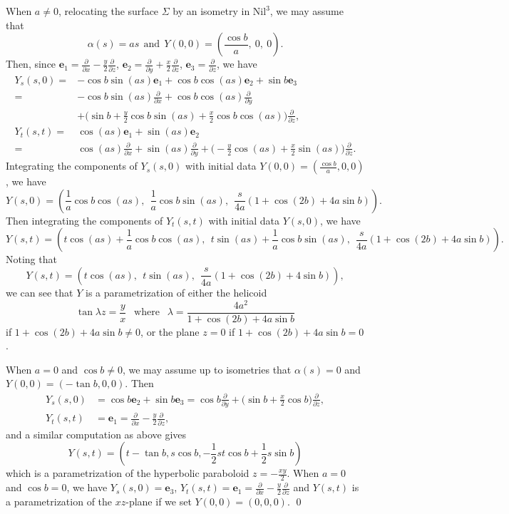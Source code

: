 \documentclass[11pt]{amsart}
\begin{document}
When $a\neq0$, relocating the surface $\Sigma$ by an isometry in $\text{Nil}^3$, we may assume that
     $$\alpha(s)=as\ \ \text{and}\ \ Y(0,0)=\left(\frac{\cos b}a ,\ 0,\ 0\right).$$
Then, since
${\mathbf{e}}_1=\frac{\partial}{\partial x}-\frac{y}2\frac{\partial}{\partial z}$,
${\mathbf{e}}_2=\frac{\partial}{\partial y}+\frac{x}2\frac{\partial}{\partial z}$,
${\mathbf{e}}_3=\frac{\partial}{\partial z}$,
we have
\[  \begin{aligned}
   Y_s (s,0) = &-\cos b\sin(as){\mathbf{e}}_1 + \cos b\cos(as){\mathbf{e}}_2 + \sin b{\mathbf{e}}_3  \\
     =&-\cos b\sin(as){\frac{\partial}{\partial {x}}}+ \cos b\cos(as){\frac{\partial}{\partial {y}}} \\
     & +\bigg(\sin b+\frac{y}2\cos b\sin(as)+ \frac{x}2\cos b\cos(as)\bigg){\frac{\partial}{\partial {z}}},  \\
   Y_t (s,t) = &\cos(as){\mathbf{e}}_1 + \sin(as){\mathbf{e}}_2\\
    =&\cos(as){\frac{\partial}{\partial {x}}}+\sin(as){\frac{\partial}{\partial {y}}}
       +\bigg(-\frac{y}2\cos(as)+\frac{x}2\sin(as)\bigg){\frac{\partial}{\partial {z}}}.
\end{aligned}   \]
Integrating the components of $Y_s(s,0)$ with initial data
$Y(0,0)=\left(\frac{\cos b}a,0,0 \right)$,  we have
\[
Y(s,0)=\left(\frac1{a}\cos b\cos(as) , \ \ \frac1{a}\cos
b\sin(as),
          \ \ \frac{s}{4a}(1+\cos(2b)+4a\sin b) \right).
\]
Then integrating the components of $Y_t(s,t)$ with initial data
$Y(s,0)$, we have
\[
Y(s,t)=\left(t\cos(as)+\frac1{a}\cos b\cos(as), \ \
t\sin(as)+\frac1{a}\cos b\sin(as),
          \ \ \frac{s}{4a}(1+\cos(2b)+4a\sin b)\right).
\]
Noting that
\[  Y(s,t)
  =\left(t\cos(as),\ \ t\sin(as),\ \ \frac{s}{4a}(1+\cos(2b)+4\sin b)\right),
\]
we can see that $Y$ is a parametrization of either the helicoid
$$ \tan{\lambda z}=\frac{y}{x} \ \ \text{ where }\ \
   \lambda=\frac{4a^2}{1+\cos(2b)+4a\sin b}$$
if $1+\cos(2b)+4a\sin b\neq 0$,  or the plane $z=0$ if
$1+\cos(2b)+4a\sin b = 0$.

When $a=0$ and $\cos b\neq 0$, we may assume up to isometries that
$\alpha(s)=0$ and  $Y(0,0)=(-\tan{b},0,0)$. Then
\[  \begin{aligned}
   Y_s (s,0) &=  \cos b{\mathbf{e}}_2 + \sin b{\mathbf{e}}_3
     =\cos b{\frac{\partial}{\partial {y}}} +\bigg(\sin b+ \frac{x}2\cos b\bigg){\frac{\partial}{\partial {z}}},  \\
   Y_t (s,t) &= {\mathbf{e}}_1 ={\frac{\partial}{\partial {x}}} -\frac{y}2 {\frac{\partial}{\partial {z}}},
\end{aligned}   \]
and a similar computation as above gives
\[
Y(s,t)=\left(t-\tan b ,  s\cos b ,  -\frac12 st\cos b +
\frac12s\sin b\right)
\]
which is a parametrization of the hyperbolic paraboloid $z=-\frac{xy}2$.
When $a=0$ and $\cos b= 0$,
we have $Y_s(s,0)={\mathbf{e}}_3$,  $Y_t(s,t)= {\mathbf{e}}_1 ={\frac{\partial}{\partial {x}}} -\frac{y}2 {\frac{\partial}{\partial {z}}}$ and
$Y(s,t)$ is a parametrization of the $xz$-plane if we set $Y(0,0)=(0,0,0)$.
\qed
\end{document}
